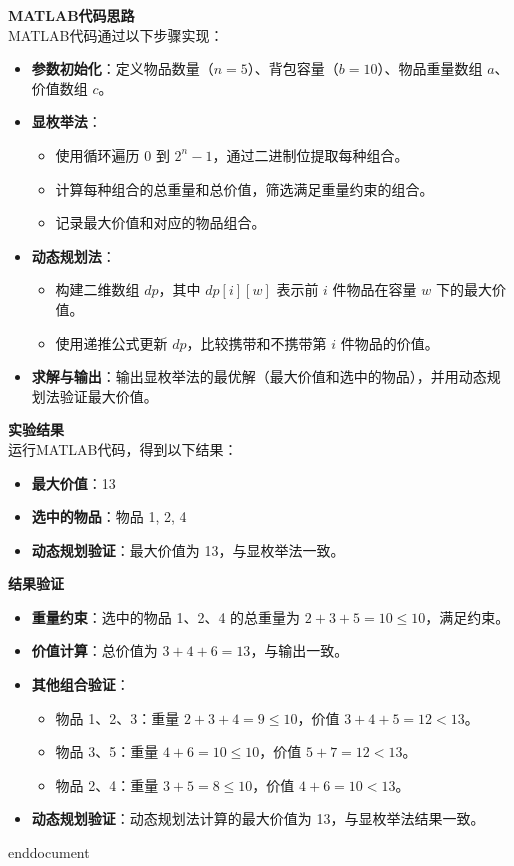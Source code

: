 \textbf{MATLAB代码思路}\\
MATLAB代码通过以下步骤实现：
\begin{itemize}
    \item \textbf{参数初始化}：定义物品数量（\( n = 5 \)）、背包容量（\( b = 10 \)）、物品重量数组 \( a \)、价值数组 \( c \)。
    \item \textbf{显枚举法}：
        \begin{itemize}
            \item 使用循环遍历 \( 0 \) 到 \( 2^n - 1 \)，通过二进制位提取每种组合。
            \item 计算每种组合的总重量和总价值，筛选满足重量约束的组合。
            \item 记录最大价值和对应的物品组合。
        \end{itemize}
    \item \textbf{动态规划法}：
        \begin{itemize}
            \item 构建二维数组 \( dp \)，其中 \( dp[i][w] \) 表示前 \( i \) 件物品在容量 \( w \) 下的最大价值。
            \item 使用递推公式更新 \( dp \)，比较携带和不携带第 \( i \) 件物品的价值。
        \end{itemize}
    \item \textbf{求解与输出}：输出显枚举法的最优解（最大价值和选中的物品），并用动态规划法验证最大价值。
\end{itemize}

\textbf{实验结果}\\
运行MATLAB代码，得到以下结果：
\begin{itemize}
    \item \textbf{最大价值}：13
    \item \textbf{选中的物品}：物品 1, 2, 4
    \item \textbf{动态规划验证}：最大价值为 13，与显枚举法一致。
\end{itemize}

\textbf{结果验证}
\begin{itemize}
    \item \textbf{重量约束}：选中的物品 1、2、4 的总重量为 \( 2 + 3 + 5 = 10 \leq 10 \)，满足约束。
    \item \textbf{价值计算}：总价值为 \( 3 + 4 + 6 = 13 \)，与输出一致。
    \item \textbf{其他组合验证}：
        \begin{itemize}
            \item 物品 1、2、3：重量 \( 2 + 3 + 4 = 9 \leq 10 \)，价值 \( 3 + 4 + 5 = 12 < 13 \)。
            \item 物品 3、5：重量 \( 4 + 6 = 10 \leq 10 \)，价值 \( 5 + 7 = 12 < 13 \)。
            \item 物品 2、4：重量 \( 3 + 5 = 8 \leq 10 \)，价值 \( 4 + 6 = 10 < 13 \)。
        \end{itemize}
    \item \textbf{动态规划验证}：动态规划法计算的最大价值为 13，与显枚举法结果一致。
\end{itemize}

\ifx\allfiles\undefined
    
    
    
    end{document}
    \else
    \fi